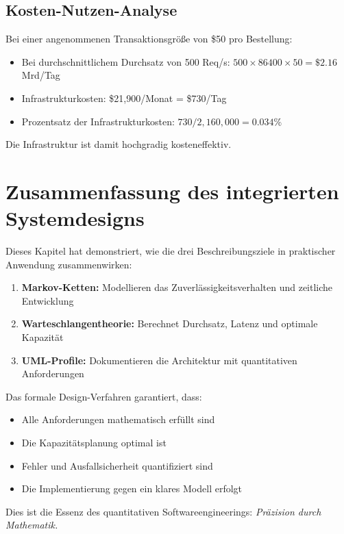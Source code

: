 \documentclass[a4paper,11pt]{article}
\theoremstyle{definition}
\begin{document}
\subsection{Kosten-Nutzen-Analyse}

Bei einer angenommenen Transaktionsgröße von \$50 pro Bestellung:

\begin{itemize}
    \item Bei durchschnittlichem Durchsatz von 500 Req/s: $500 \times 86400 \times 50 = \$2.16$ Mrd/Tag
    \item Infrastrukturkosten: \$21,900/Monat = \$730/Tag
    \item Prozentsatz der Infrastrukturkosten: $730 / 2,160,000 = 0.034\%$
\end{itemize}

Die Infrastruktur ist damit hochgradig kosteneffektiv.

\section{Zusammenfassung des integrierten Systemdesigns}

Dieses Kapitel hat demonstriert, wie die drei Beschreibungsziele in praktischer Anwendung zusammenwirken:

\begin{enumerate}
    \item \textbf{Markov-Ketten:} Modellieren das Zuverlässigkeitsverhalten und zeitliche Entwicklung
    \item \textbf{Warteschlangentheorie:} Berechnet Durchsatz, Latenz und optimale Kapazität
    \item \textbf{UML-Profile:} Dokumentieren die Architektur mit quantitativen Anforderungen
\end{enumerate}

Das formale Design-Verfahren garantiert, dass:
\begin{itemize}
    \item Alle Anforderungen mathematisch erfüllt sind
    \item Die Kapazitätsplanung optimal ist
    \item Fehler und Ausfallsicherheit quantifiziert sind
    \item Die Implementierung gegen ein klares Modell erfolgt
\end{itemize}

Dies ist die Essenz des quantitativen Softwareengineerings: \emph{Präzision durch Mathematik.}
\end{document}
